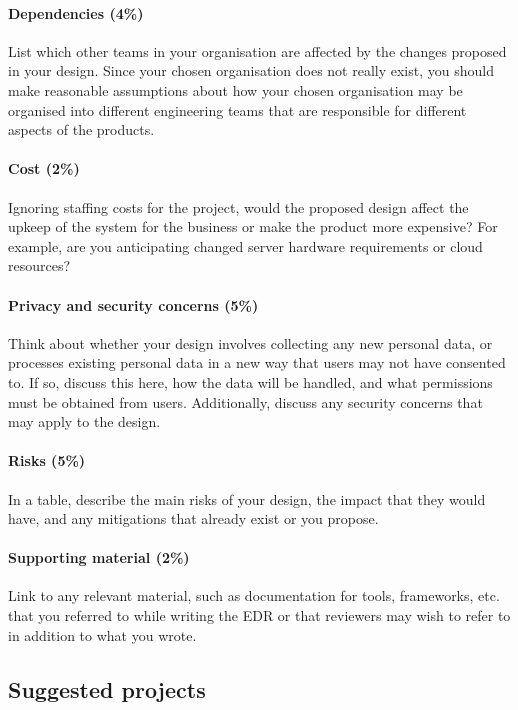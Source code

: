 \paragraph{Dependencies (4\%)} List which other teams in your organisation are affected by the changes proposed in your design. Since your chosen organisation does not really exist, you should make reasonable assumptions about how your chosen organisation may be organised into different engineering teams that are responsible for different aspects of the products.

\paragraph{Cost (2\%)} Ignoring staffing costs for the project, would the proposed design affect the upkeep of the system for the business or make the product more expensive? For example, are you anticipating changed server hardware requirements or cloud resources?

\paragraph{Privacy and security concerns (5\%)} Think about whether your design involves collecting any new personal data, or processes existing personal data in a new way that users may not have consented to. If so, discuss this here, how the data will be handled, and what permissions must be obtained from users. Additionally, discuss any security concerns that may apply to the design.

\paragraph{Risks (5\%)} In a table, describe the main risks of your design, the impact that they would have, and any mitigations that already exist or you propose.

\paragraph{Supporting material (2\%)} Link to any relevant material, such as documentation for tools, frameworks, etc. that you referred to while writing the EDR or that reviewers may wish to refer to in addition to what you wrote.

\subsection{Suggested projects}
\label{sec:edr-suggestions}

